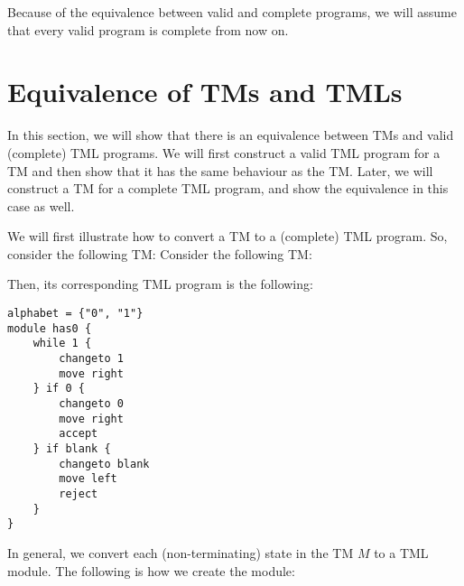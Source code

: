 Because of the equivalence between valid and complete programs, we will assume that every valid program is complete from now on.

\section{Equivalence of TMs and TMLs}
In this section, we will show that there is an equivalence between TMs and valid (complete) TML programs. We will first construct a valid TML program for a TM and then show that it has the same behaviour as the TM. Later, we will construct a TM for a complete TML program, and show the equivalence in this case as well.

We will first illustrate how to convert a TM to a (complete) TML program. So, consider the following TM:
Consider the following TM:
\begin{figure}[H]
    \centering
\end{figure}
Then, its corresponding TML program is the following:
\begin{lstlisting}[language=TML]
alphabet = {"0", "1"}
module has0 {
    while 1 {
        changeto 1
        move right
    } if 0 {
        changeto 0
        move right
        accept
    } if blank {
        changeto blank
        move left
        reject
    }
}
\end{lstlisting}
In general, we convert each (non-terminating) state in the TM $M$ to a TML module. The following is how we create the module:

